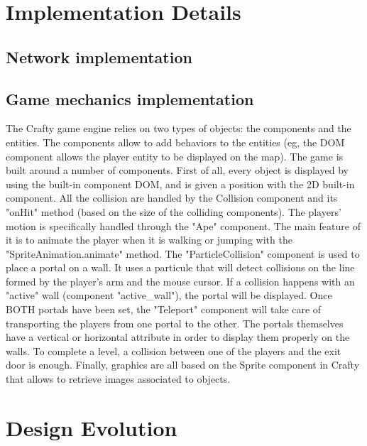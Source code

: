 \documentclass{chi-ext}
\begin{document}
\section{Implementation Details}
\subsection{Network implementation}


\subsection{Game mechanics implementation}
The Crafty game engine relies on two types of objects: the components and the entities. The components allow to add behaviors to the entities (eg, the DOM component allows the player entity to be displayed on the map).
\newline
\newline
The game is built around a number of components.
\newline
First of all, every object is displayed by using the built-in component DOM, and is given a position with the 2D built-in component. All the collision are handled by the Collision component and its "onHit" method (based on the size of the colliding components).
\newline
The players' motion is specifically handled through the "Ape" component. The main feature of it is to animate the player when it is walking or jumping with the "SpriteAnimation.animate" method.
\newline
The "ParticleCollision" component is used to place a portal on a wall. It uses a particule that will detect collisions on the line formed by the player's arm and the mouse cursor. If a collision happens with an "active" wall (component "active_wall"), the portal will be displayed. Once BOTH portals have been set, the "Teleport" component will take care of transporting the players from one portal to the other. The portals themselves have a vertical or horizontal attribute in order to display them properly on the walls.
\newline
To complete a level, a collision between one of the players and the exit door is enough.
\newline
Finally, graphics are all based on the Sprite component in Crafty that allows to retrieve images associated to objects.
\newline

\section{Design Evolution}
\end{document}
